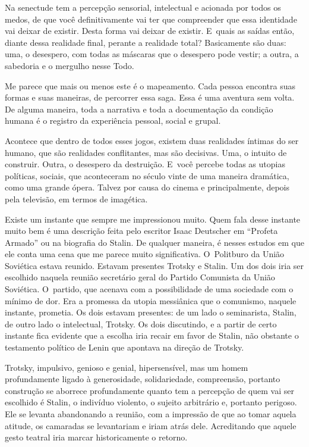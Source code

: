  

Na senectude tem a percepção sensorial, intelectual e acionada por todos
os medos, de que você definitivamente vai ter que compreender que essa
identidade vai deixar de existir. Desta forma vai deixar de existir. E~quais as saídas então, diante dessa realidade final, perante a realidade
total? Basicamente são duas: uma, o desespero, com todas as máscaras que
o desespero pode vestir; a outra, a sabedoria e o mergulho nesse Todo.

Me parece que mais ou menos este é o mapeamento. Cada pessoa encontra
suas formas e suas maneiras, de percorrer essa saga. Essa é uma aventura
sem volta. De alguma maneira, toda a narrativa e toda a documentação da
condição humana é o registro da experiência pessoal, social e grupal.

 

Acontece que dentro de todos esses jogos, existem duas realidades
íntimas do ser humano, que são realidades conflitantes, mas são
decisivas. Uma, o intuito de construir. Outra, o desespero da
destruição. E~você percebe todas as utopias políticas, sociais, que
aconteceram no século vinte de uma maneira dramática, como uma grande
ópera. Talvez por causa do cinema e principalmente, depois pela
televisão, em termos de imagética.

 

Existe um instante que sempre me impressionou muito. Quem fala desse
instante muito bem é uma descrição feita pelo escritor Isaac Deutscher
em ``Profeta Armado'' ou na biografia do Stalin. De qualquer maneira, é
nesses estudos em que ele conta uma cena que me parece muito
significativa. O~Politburo da União Soviética estava reunido. Estavam
presentes Trotsky e Stalin. Um dos dois iria ser escolhido naquela
reunião secretário geral do Partido Comunista da União Soviética. O~partido, que acenava com a possibilidade de uma sociedade com o mínimo
de dor. Era a promessa da utopia messiânica que o comunismo, naquele
instante, prometia. Os dois estavam presentes: de um lado o seminarista,
Stalin, de outro lado o intelectual, Trotsky. Os dois discutindo, e a
partir de certo instante fica evidente que a escolha iria recair em
favor de Stalin, não obstante o testamento político de Lenin que
apontava na direção de Trotsky.

 

Trotsky, impulsivo, genioso e genial, hipersensível, mas um homem
profundamente ligado à generosidade, solidariedade, compreensão,
portanto construção se aborrece profundamente quanto tem a percepção de
quem vai ser escolhido é Stalin, o indivíduo violento, o sujeito
arbitrário e, portanto perigoso. Ele se levanta abandonando a reunião,
com a impressão de que ao tomar aquela atitude, os camaradas se
levantariam e iriam atrás dele. Acreditando que aquele gesto teatral
iria marcar historicamente o retorno.

